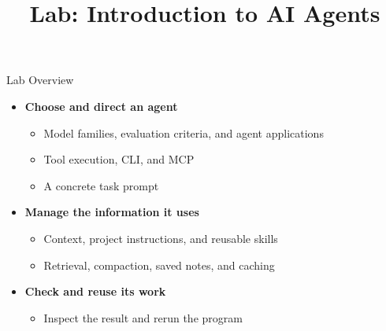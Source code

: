 \newcommand{\CourseTemplatePath}{../../../../../templates/slides/}

\title[Introduction to AI Agents]{Lab: Introduction to AI Agents}
\newif\ifShowExtendedAIContent
\ShowExtendedAIContentfalse

\makecoursetitle

\ifShowExtendedAIContent
\begin{frame}{Lab Overview}

\begin{itemize}
\item \textbf{Choose and direct an agent}
  \begin{itemize}
  \item Model families, evaluation criteria, and agent applications
  \item Tool execution, CLI, and MCP
  \item A concrete task prompt
  \end{itemize}
\item \textbf{Manage the information it uses}
  \begin{itemize}
  \item Context, project instructions, and reusable skills
  \item Retrieval, compaction, saved notes, and caching
  \end{itemize}
\item \textbf{Check and reuse its work}
  \begin{itemize}
  \item Inspect the result and rerun the program
  \end{itemize}
\end{itemize}
\end{frame}
\else

